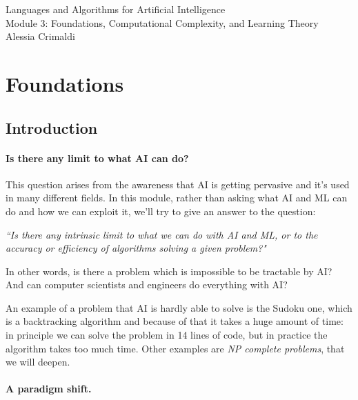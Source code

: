 \documentclass{article}
\author{Alessia Crimaldi}
\begin{document}
	\begin{titlepage}
    	\vspace*{\fill}
   		\centering
   		\Huge Languages and Algorithms for Artificial Intelligence\\
		\vspace{0.2cm}
   		\huge Module 3: Foundations, Computational Complexity, and Learning Theory\\
   		\vspace{0.7cm}
   		\Large Alessia Crimaldi
    	\vspace*{\fill}
	\end{titlepage}
	\tableofcontents
	\clearpage
	\parindent 0pt
	\cleardoublepage

	\section{Foundations}
		\subsection{Introduction}
			\paragraph{\large Is there any limit to what AI can do?}
			\mbox{}
			\vspace{0.1cm}
			
			This question arises from the awareness that AI is getting pervasive and it's used in many different fields.
			In this module, rather than asking what AI and ML can do and how we can exploit it, we'll try to give an answer to the question:
			\begin{center}
				\textit{``Is there any intrinsic limit to what we can do with AI and ML, or to the accuracy or efficiency of algorithms solving a given problem?"}
			\end{center}
			In other words, is there a problem which is impossible to be tractable by AI? And can computer scientists and engineers do everything with AI?
			\vspace{0.1cm}
			
			An example of a problem that AI is hardly able to solve is the Sudoku one, which is a backtracking algorithm and because of that it takes a huge amount of time: in principle we can solve the problem in 14 lines of code, but in practice the algorithm takes too much time. Other examples are \textit{NP complete problems}, that we will deepen.
			\paragraph{\large A paradigm shift.}
			\mbox{}
			\vspace{0.1cm}
	
\end{document}
